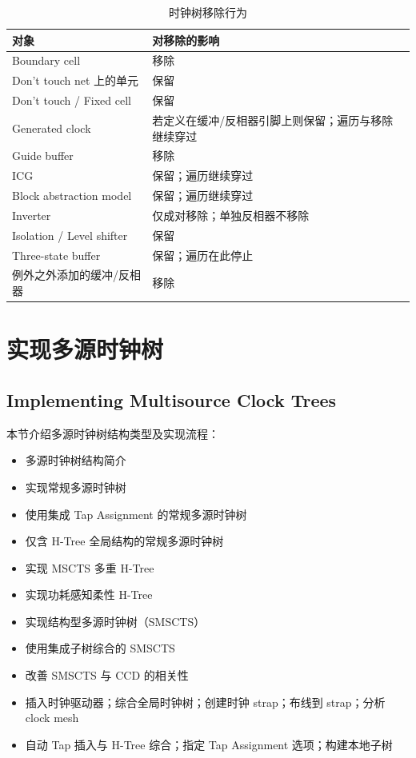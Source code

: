 \begin{table}[htbp]
\centering
\caption{时钟树移除行为}
\label{tab:rm-cts}
\begin{tabularx}{\textwidth}{@{}l X@{}}
\toprule
\textbf{对象} & \textbf{对移除的影响} \\
\midrule
Boundary cell & 移除 \\
Don't touch net 上的单元 & 保留 \\
Don't touch / Fixed cell & 保留 \\
Generated clock & 若定义在缓冲/反相器引脚上则保留；遍历与移除继续穿过 \\
Guide buffer & 移除 \\
ICG & 保留；遍历继续穿过 \\
Block abstraction model & 保留；遍历继续穿过 \\
Inverter & 仅成对移除；单独反相器不移除 \\
Isolation / Level shifter & 保留 \\
Three-state buffer & 保留；遍历在此停止 \\
例外之外添加的缓冲/反相器 & 移除 \\
\bottomrule
\end{tabularx}
\end{table}

\section{实现多源时钟树}
\subsection*{Implementing Multisource Clock Trees}

本节介绍多源时钟树结构类型及实现流程：
\begin{itemize}
  \item 多源时钟树结构简介
  \item 实现常规多源时钟树
  \item 使用集成 Tap Assignment 的常规多源时钟树
  \item 仅含 H-Tree 全局结构的常规多源时钟树
  \item 实现 MSCTS 多重 H-Tree
  \item 实现功耗感知柔性 H-Tree
  \item 实现结构型多源时钟树（SMSCTS）
  \item 使用集成子树综合的 SMSCTS
  \item 改善 SMSCTS 与 CCD 的相关性
  \item 插入时钟驱动器；综合全局时钟树；创建时钟 strap；布线到 strap；分析 clock mesh
  \item 自动 Tap 插入与 H-Tree 综合；指定 Tap Assignment 选项；构建本地子树
\end{itemize}

